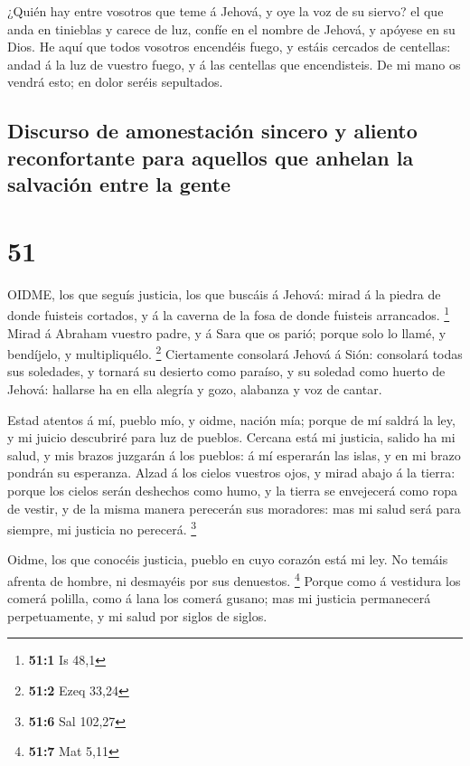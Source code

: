  ¿Quién hay entre vosotros que teme á Jehová, y oye la voz
de su siervo? el que anda en tinieblas y carece de luz, confíe en el
nombre de Jehová, y apóyese en su Dios.  He aquí que todos
vosotros encendéis fuego, y estáis cercados de centellas: andad á la luz
de vuestro fuego, y á las centellas que encendisteis. De mi mano os
vendrá esto; en dolor seréis sepultados.

\hypertarget{discurso-de-amonestaciuxf3n-sincero-y-aliento-reconfortante-para-aquellos-que-anhelan-la-salvaciuxf3n-entre-la-gente}{%
\subsection{Discurso de amonestación sincero y aliento reconfortante
para aquellos que anhelan la salvación entre la
gente}\label{discurso-de-amonestaciuxf3n-sincero-y-aliento-reconfortante-para-aquellos-que-anhelan-la-salvaciuxf3n-entre-la-gente}}

\hypertarget{section-50}{%
\section{51}\label{section-50}}

 OIDME, los que seguís justicia, los que buscáis á Jehová:
mirad á la piedra de donde fuisteis cortados, y á la caverna de la fosa
de donde fuisteis arrancados. \footnote{\textbf{51:1} Is 48,1}
 Mirad á Abraham vuestro padre, y á Sara que os parió;
porque solo lo llamé, y bendíjelo, y multipliquélo. \footnote{\textbf{51:2}
  Ezeq 33,24}  Ciertamente consolará Jehová á Sión:
consolará todas sus soledades, y tornará su desierto como paraíso, y su
soledad como huerto de Jehová: hallarse ha en ella alegría y gozo,
alabanza y voz de cantar.

 Estad atentos á mí, pueblo mío, y oidme, nación mía; porque
de mí saldrá la ley, y mi juicio descubriré para luz de pueblos.
 Cercana está mi justicia, salido ha mi salud, y mis brazos
juzgarán á los pueblos: á mí esperarán las islas, y en mi brazo pondrán
su esperanza.  Alzad á los cielos vuestros ojos, y mirad
abajo á la tierra: porque los cielos serán deshechos como humo, y la
tierra se envejecerá como ropa de vestir, y de la misma manera perecerán
sus moradores: mas mi salud será para siempre, mi justicia no perecerá.
\footnote{\textbf{51:6} Sal 102,27}

 Oidme, los que conocéis justicia, pueblo en cuyo corazón
está mi ley. No temáis afrenta de hombre, ni desmayéis por sus
denuestos. \footnote{\textbf{51:7} Mat 5,11}  Porque como á
vestidura los comerá polilla, como á lana los comerá gusano; mas mi
justicia permanecerá perpetuamente, y mi salud por siglos de siglos.

